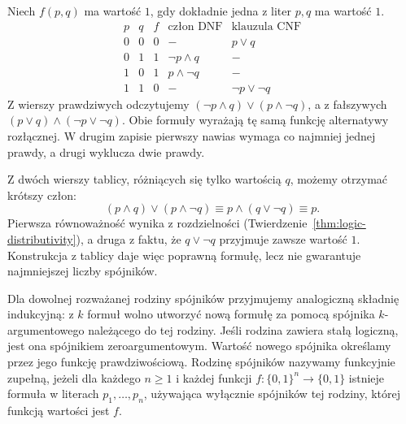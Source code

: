 \begin{przyklad}
\label{ex:lst-xor-normal-forms}
Niech $f(p,q)$ ma wartość $1$, gdy dokładnie jedna
z liter $p,q$ ma wartość $1$.
\[
\begin{array}{c|c|c|l|l}
 p&q&f&\text{człon DNF}&\text{klauzula CNF}\\ \hline
 0&0&0&-&p\lor q\\
 0&1&1&\neg p\land q&-\\
 1&0&1&p\land\neg q&-\\
 1&1&0&-&\neg p\lor\neg q
\end{array}
\]
Z wierszy prawdziwych odczytujemy
$(\neg p\land q)\lor(p\land\neg q)$,
a z fałszywych $(p\lor q)\land(\neg p\lor\neg q)$.
Obie formuły wyrażają tę samą funkcję alternatywy
rozłącznej. W drugim zapisie pierwszy nawias wymaga
co najmniej jednej prawdy, a drugi wyklucza dwie prawdy.
\end{przyklad}

\begin{przyklad}
\label{ex:lst-dnf-simplification}
Z dwóch wierszy tablicy, różniących się
tylko wartością $q$, możemy otrzymać krótszy człon:
\[
 (p\land q)\lor(p\land\neg q)
 \equiv p\land(q\lor\neg q)\equiv p.
\]
Pierwsza równoważność wynika z rozdzielności
(Twierdzenie~\ref{thm:logic-distributivity}),
a druga z faktu, że $q\lor\neg q$ przyjmuje zawsze
wartość $1$. Konstrukcja z tablicy daje więc
poprawną formułę, lecz nie gwarantuje najmniejszej
liczby spójników.
\end{przyklad}

\begin{definicja}
\label{def:lst-functional-completeness}
Dla dowolnej rozważanej rodziny spójników przyjmujemy
analogiczną składnię indukcyjną: z $k$ formuł wolno utworzyć
nową formułę za pomocą spójnika $k$-argumentowego należącego
do tej rodziny. Jeśli rodzina zawiera stałą logiczną, jest
ona spójnikiem zeroargumentowym. Wartość nowego spójnika
określamy przez jego funkcję prawdziwościową.
Rodzinę spójników nazywamy funkcyjnie zupełną, jeżeli
dla każdego $n\geq1$ i każdej funkcji
$f:\{0,1\}^n\to\{0,1\}$ istnieje formuła w literach
$p_1,\ldots,p_n$, używająca wyłącznie spójników
tej rodziny, której funkcją wartości jest $f$.
\end{definicja}

